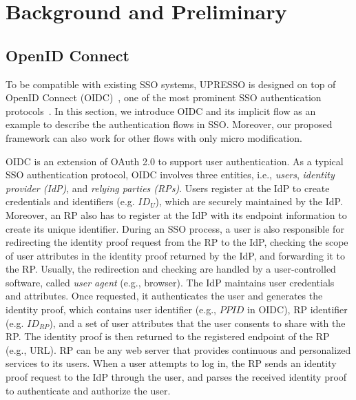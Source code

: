 \section{Background and Preliminary}
\label{sec:background}


\subsection{OpenID Connect}
\label{subsec:OIDC}

To be compatible with existing SSO systems, UPRESSO is designed on top of OpenID Connect (OIDC)~\cite{OpenIDConnect}, one of the most prominent SSO authentication protocols~\cite{SAMLIdentifier}. In this section, we introduce OIDC and its implicit flow as an example to describe the authentication flows in SSO. Moreover, our proposed framework can also work for other flows with only micro modification.

OIDC is an extension of OAuth 2.0 to support user authentication. As a typical SSO authentication protocol, OIDC involves three entities, i.e., {\em users}, {\em identity provider (IdP)}, and {\em relying parties (RPs)}. Users register at the IdP to create credentials and identifiers (e.g. $ID_U$), which are securely maintained by the IdP. Moreover, an RP also has to register at the IdP with its endpoint information to create its unique identifier. During an SSO process, a user is also responsible for redirecting the identity proof request from the RP to the IdP, checking the scope of user attributes in the identity proof returned by the IdP, and forwarding it to the RP. Usually, the redirection and checking are handled by a user-controlled software, called {\em user agent} (e.g., browser). The IdP maintains user credentials and attributes. Once requested, it authenticates the user and generates the identity proof, which contains user identifier (e.g., $PPID$ in OIDC), RP identifier (e.g. $ID_{RP}$), and a set of user attributes that the user consents to share with the RP. The identity proof is then returned to the registered endpoint of the RP (e.g., URL). RP can be any web server that provides continuous and personalized services to its users. When a user attempts to log in, the RP sends an identity proof request to the IdP through the user, and parses the received identity proof to authenticate and authorize the user.



